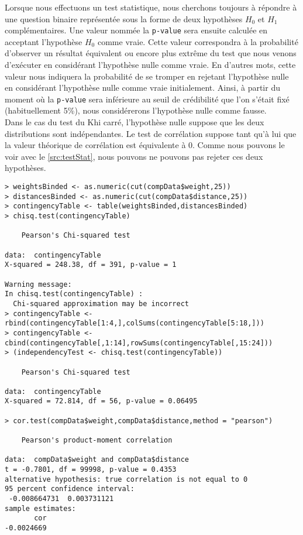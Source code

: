 Lorsque nous effectuons un test statistique, nous cherchons toujours à répondre à une question binaire représentée sous la forme de deux hypothèses $H_0$ et $H_1$ complémentaires. Une valeur nommée la \texttt{p-value} sera ensuite calculée en acceptant l'hypothèse $H_0$ comme vraie. Cette valeur correspondra à la probabilité d'observer un résultat équivalent ou encore plus extrême du test que nous venons d'exécuter en considérant l'hypothèse nulle comme vraie. En d'autres mots, cette valeur nous indiquera la probabilité de se tromper en rejetant l'hypothèse nulle en considérant l'hypothèse nulle comme vraie initialement. Ainsi, à partir du moment où la \texttt{p-value} sera inférieure au seuil de crédibilité que l'on s'était fixé (habituellement 5\%), nous considérerons l'hypothèse nulle comme fausse. \\ 

Dans le cas du test du Khi carré, l'hypothèse nulle suppose que les deux distributions sont indépendantes. Le test de corrélation suppose tant qu'à lui que la valeur théorique de corrélation est équivalente à 0. Comme nous pouvons le voir avec le \autoref{src:testStat}, nous pouvons ne pouvons pas rejeter ces deux hypothèses. \\

\begin{lstlisting}[caption = Tests d'indépendance et de corrélation entre distributions,label=src:testStat]
> weightsBinded <- as.numeric(cut(compData$weight,25))
> distancesBinded <- as.numeric(cut(compData$distance,25))
> contingencyTable <- table(weightsBinded,distancesBinded)
> chisq.test(contingencyTable)

	Pearson's Chi-squared test

data:  contingencyTable
X-squared = 248.38, df = 391, p-value = 1

Warning message:
In chisq.test(contingencyTable) :
  Chi-squared approximation may be incorrect
> contingencyTable <- rbind(contingencyTable[1:4,],colSums(contingencyTable[5:18,]))
> contingencyTable <- cbind(contingencyTable[,1:14],rowSums(contingencyTable[,15:24]))
> (independencyTest <- chisq.test(contingencyTable))

	Pearson's Chi-squared test

data:  contingencyTable
X-squared = 72.814, df = 56, p-value = 0.06495

> cor.test(compData$weight,compData$distance,method = "pearson")

	Pearson's product-moment correlation

data:  compData$weight and compData$distance
t = -0.7801, df = 99998, p-value = 0.4353
alternative hypothesis: true correlation is not equal to 0
95 percent confidence interval:
 -0.008664731  0.003731121
sample estimates:
       cor 
-0.0024669 
\end{lstlisting}

